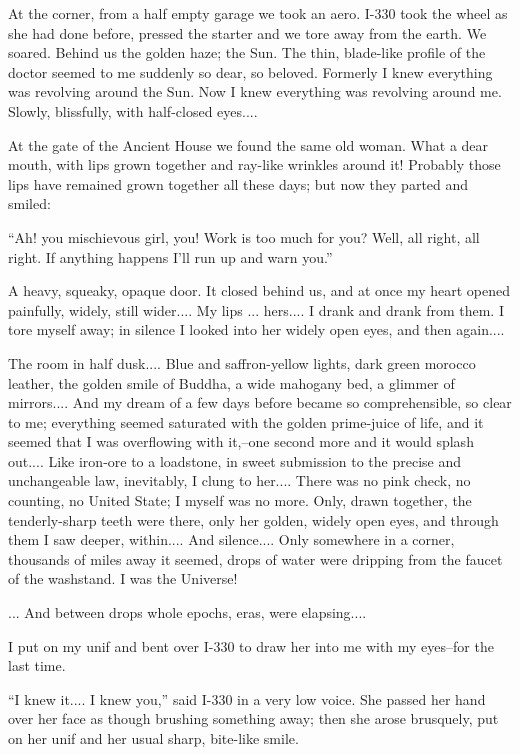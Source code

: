 \documentclass[11pt,openany]{book}
\begin{document}
At the corner, from a half empty garage we took an aero. I-330 took the wheel as she had done before, pressed the starter and we tore away from the earth. We soared. Behind us the golden haze; the Sun. The thin, blade-like profile of the doctor seemed to me suddenly so dear, so beloved. Formerly I knew everything was revolving around the Sun. Now I knew everything was revolving around me. Slowly, blissfully, with half-closed eyes....

At the gate of the Ancient House we found the same old woman. What a dear mouth, with lips grown together and ray-like wrinkles around it! Probably those lips have remained grown together all these days; but now they parted and smiled:

``Ah! you mischievous girl, you! Work is too much for you? Well, all right, all right. If anything happens I'll run up and warn you.''

A heavy, squeaky, opaque door. It closed behind us, and at once my heart opened painfully, widely, still wider.... My lips ... hers.... I drank and drank from them. I tore myself away; in silence I looked into her widely open eyes, and then again....

The room in half dusk.... Blue and saffron-yellow lights, dark green morocco leather, the golden smile of Buddha, a wide mahogany bed, a glimmer of mirrors.... And my dream of a few days before became so comprehensible, so clear to me; everything seemed saturated with the golden prime-juice of life, and it seemed that I was overflowing with it,--one second more and it would splash out.... Like iron-ore to a loadstone, in sweet submission to the precise and unchangeable law, inevitably, I clung to her.... There was no pink check, no counting, no United State; I myself was no more. Only, drawn together, the tenderly-sharp teeth were there, only her golden, widely open eyes, and through them I saw deeper, within.... And silence.... Only somewhere in a corner, thousands of miles away it seemed, drops of water were dripping from the faucet of the washstand. I was the Universe!

... And between drops whole epochs, eras, were elapsing....

I put on my unif and bent over I-330 to draw her into me with my eyes--for the last time.

``I knew it.... I knew you,'' said I-330 in a very low voice. She passed her hand over her face as though brushing something away; then she arose brusquely, put on her unif and her usual sharp, bite-like smile.
\end{document}
